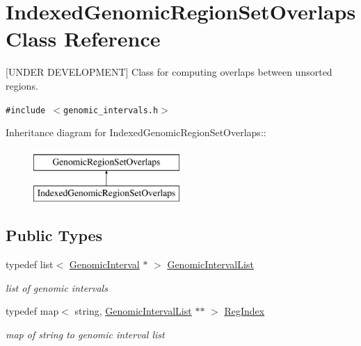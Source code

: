 \hypertarget{classIndexedGenomicRegionSetOverlaps}{
\section{IndexedGenomicRegionSetOverlaps Class Reference}
\label{classIndexedGenomicRegionSetOverlaps}
}
\mbox{[}UNDER DEVELOPMENT\mbox{]} Class for computing overlaps between unsorted regions.  


{\tt \#include $<$genomic\_\-intervals.h$>$}

Inheritance diagram for IndexedGenomicRegionSetOverlaps::\begin{figure}[H]
\begin{center}
\leavevmode
\includegraphics[height=2cm]{classIndexedGenomicRegionSetOverlaps}
\end{center}
\end{figure}
\subsection*{Public Types}
\begin{CompactItemize}
\item 
\hypertarget{classIndexedGenomicRegionSetOverlaps_7089cf532b97ac0157a65ed5bb1b1949}{
typedef list$<$ \hyperlink{classGenomicInterval}{GenomicInterval} $\ast$ $>$ \hyperlink{classIndexedGenomicRegionSetOverlaps_7089cf532b97ac0157a65ed5bb1b1949}{GenomicIntervalList}}
\label{classIndexedGenomicRegionSetOverlaps_7089cf532b97ac0157a65ed5bb1b1949}

\begin{CompactList}\small\item\em list of genomic intervals \item\end{CompactList}\item 
\hypertarget{classIndexedGenomicRegionSetOverlaps_de47ae96555af24f64698fe743a6436c}{
typedef map$<$ string, \hyperlink{classIndexedGenomicRegionSetOverlaps_7089cf532b97ac0157a65ed5bb1b1949}{GenomicIntervalList} $\ast$$\ast$ $>$ \hyperlink{classIndexedGenomicRegionSetOverlaps_de47ae96555af24f64698fe743a6436c}{RegIndex}}
\label{classIndexedGenomicRegionSetOverlaps_de47ae96555af24f64698fe743a6436c}

\begin{CompactList}\small\item\em map of string to genomic interval list \item\end{CompactList}\end{CompactItemize}
